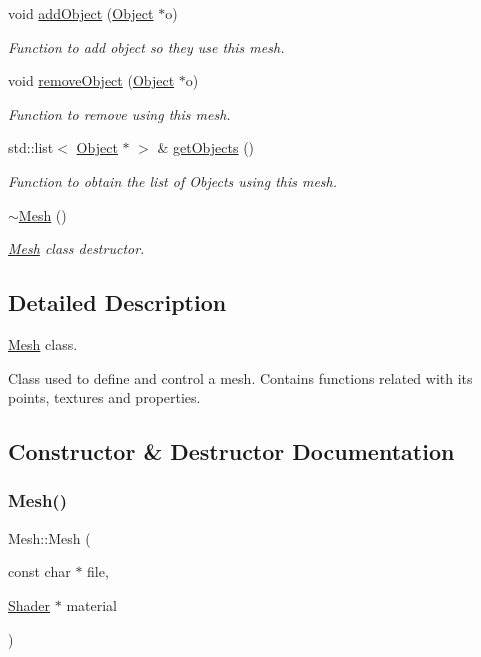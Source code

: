 \begin{DoxyCompactItemize}
void \hyperlink{class_mesh_a81e2edec37429d2830a551d07476c7ba}{add\+Object} (\hyperlink{class_object}{Object} $\ast$o)
\begin{DoxyCompactList}\small\item\em Function to add object so they use this mesh. \end{DoxyCompactList}\item 
void \hyperlink{class_mesh_a7c209ba6e5596edaeb9062cf23d3532b}{remove\+Object} (\hyperlink{class_object}{Object} $\ast$o)
\begin{DoxyCompactList}\small\item\em Function to remove using this mesh. \end{DoxyCompactList}\item 
std\+::list$<$ \hyperlink{class_object}{Object} $\ast$ $>$ \& \hyperlink{class_mesh_aadc3cc59b0dccf99961105431a717579}{get\+Objects} ()
\begin{DoxyCompactList}\small\item\em Function to obtain the list of Objects using this mesh. \end{DoxyCompactList}\item 
\hyperlink{class_mesh_a5efe4da1a4c0971cfb037bd70304c303}{$\sim$\+Mesh} ()
\begin{DoxyCompactList}\small\item\em \hyperlink{class_mesh}{Mesh} class destructor. \end{DoxyCompactList}\end{DoxyCompactItemize}


\subsection{Detailed Description}
\hyperlink{class_mesh}{Mesh} class. 

Class used to define and control a mesh. Contains functions related with its points, textures and properties. 

\subsection{Constructor \& Destructor Documentation}
\mbox{\label{class_mesh_a7cb142bf7cd75a954813ccebe1780b77}} 
\subsubsection{\texorpdfstring{Mesh()}{Mesh()}\hspace{0.1cm}{\footnotesize\ttfamily [1/2]}}
{\footnotesize\ttfamily Mesh\+::\+Mesh (\begin{DoxyParamCaption}\item[{const char $\ast$}]{file,  }\item[{\hyperlink{class_shader}{Shader} $\ast$}]{material }\end{DoxyParamCaption})}



